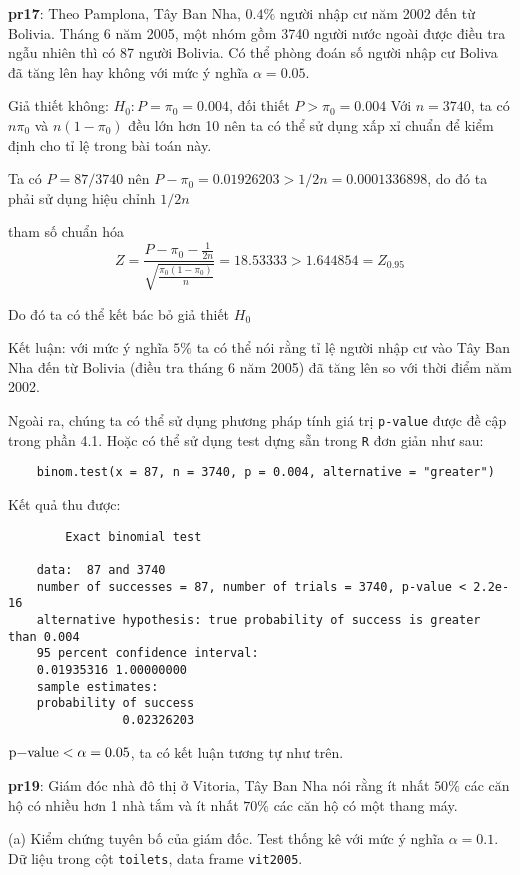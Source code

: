 \textbf{pr17}: Theo Pamplona, Tây Ban Nha, $0.4\%$ người nhập cư năm 2002 đến từ Bolivia.
Tháng 6 năm 2005, một nhóm gồm 3740 người nước ngoài được điều tra ngẫu nhiên thì có 87 người 
Bolivia. Có thể phòng đoán số người nhập cư Boliva đã tăng lên hay không với mức ý nghĩa $\alpha = 0.05$.

Giả thiết không: $H_0: P = \pi_0 = 0.004$, đối thiết $P > \pi_0 = 0.004$
Với $n = 3740$, ta có $n\pi_0$ và $n(1 - \pi_0)$ đều lớn hơn 10 nên ta có thể sử dụng xấp xỉ chuẩn 
để kiểm định cho tỉ lệ trong bài toán này.

Ta có $P = 87/3740$ nên $P - \pi_0 = 0.01926203 > 1/2n = 0.0001336898$, do đó ta phải sử dụng hiệu chỉnh $1/2n$

tham số chuẩn hóa 
$$Z = \frac{P - \pi_0 - \frac{1}{2n}}{\sqrt{\frac{\pi_0(1 - \pi_0)}{n}}} = 18.53333 > 1.644854 = Z_{0.95}$$

Do đó ta có thể kết bác bỏ giả thiết $H_0$

Kết luận: với mức ý nghĩa $5\%$ ta có thể nói rằng tỉ lệ người nhập cư vào Tây Ban Nha đến từ Bolivia (điều tra tháng 6 năm 2005)
đã tăng lên so với thời điểm năm 2002.

Ngoài ra, chúng ta có thể sử dụng phương pháp tính giá trị \lstinline{p-value} được đề cập trong phần 4.1.
Hoặc có thể sử dụng test dựng sẵn trong \lstinline{R} đơn giản như sau:

\begin{lstlisting}
    binom.test(x = 87, n = 3740, p = 0.004, alternative = "greater")
\end{lstlisting}

Kết quả thu được:

\begin{lstlisting}
        Exact binomial test

    data:  87 and 3740
    number of successes = 87, number of trials = 3740, p-value < 2.2e-16
    alternative hypothesis: true probability of success is greater than 0.004
    95 percent confidence interval:
    0.01935316 1.00000000
    sample estimates:
    probability of success 
                0.02326203 
\end{lstlisting}

$\text{\lstinline{p-value}} < \alpha = 0.05$, ta có kết luận tương tự như trên.

\textbf{pr19}: Giám đóc nhà đô thị ở Vitoria, Tây Ban Nha nói rằng ít nhất $50\%$
các căn hộ có nhiều hơn 1 nhà tắm và ít nhất $70\%$ các căn hộ có một thang máy.

(a) Kiểm chứng tuyên bố của giám đốc. Test thống kê với mức ý nghĩa $\alpha = 0.1$. 
Dữ liệu trong cột \lstinline{toilets}, data frame \lstinline{vit2005}.

